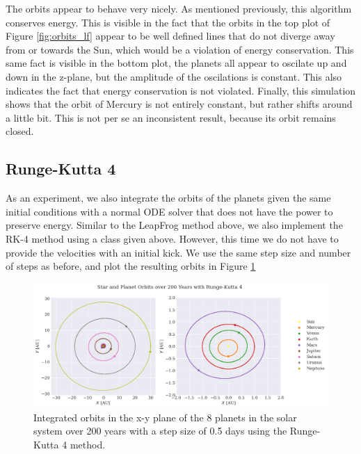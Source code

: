 The orbits appear to behave very nicely. As mentioned previously, this algorithm conserves energy. This is visible in the fact that the orbits in the top plot of Figure \ref{fig:orbits_lf} appear to be well defined lines that do not diverge away from or towards the Sun, which would be a violation of energy conservation. This same fact is visible in the bottom plot, the planets all appear to oscilate up and down in the z-plane, but the amplitude of the oscilations is constant. This also indicates the fact that energy conservation is not violated. Finally, this simulation shows that the orbit of Mercury is not entirely constant, but rather shifts around a little bit. This is not per se an inconsistent result, because its orbit remains closed.

\subsection{Runge-Kutta 4}



As an experiment, we also integrate the orbits of the planets given the same initial conditions with a normal ODE solver that does not have the power to preserve energy. Similar to the LeapFrog method above, we also implement the RK-4 method using a class given above. However, this time we do not have to provide the velocities with an initial kick. We use the same step size and number of steps as before, and plot the resulting orbits in Figure \ref{fig:orbits_rk4}

\begin{figure}
    \centering
    \includegraphics[width=\textwidth]{results/orbits_rk4.png}
    \caption{Integrated orbits in the x-y plane of the 8 planets in the solar system over 200 years with a step size of 0.5 days using the Runge-Kutta 4 method.}
    \label{fig:orbits_rk4}
\end{figure}

